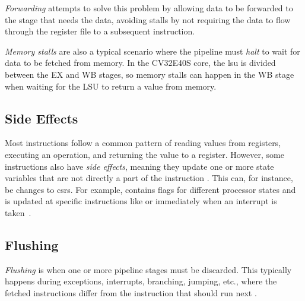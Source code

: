 \textit{Forwarding} attempts to solve this problem by allowing data to be forwarded to the stage that needs the data, avoiding stalls by not requiring the data to flow through the register file to a subsequent instruction.

\textit{Memory stalls} are also a typical scenario where the pipeline must \textit{halt} to wait for data to be fetched from memory. In the CV32E40S core, the \acrshort{lsu} is divided between the EX and WB stages, so memory stalls can happen in the WB stage when waiting for the LSU to return a value from memory.


\subsection{Side Effects}

Most instructions follow a common pattern of reading values from registers, executing an operation, and returning the value to a register.
However, some instructions also have \textit{side effects}, meaning they update one or more state variables that are not directly a part of the instruction \cite{taylorAdvancedRISCVVerification2023}. This can, for instance, be changes to \acrshort{csr}s. For example,  contains flags for different processor states and is updated at specific instructions like  or immediately when an interrupt is taken~\cite{openhwgroupExceptionsInterruptsCOREV2023}. 


%

\subsection{Flushing}
\label{sec:bg_flushing}

\textit{Flushing} is when one or more pipeline stages must be discarded. This typically happens during exceptions, interrupts, branching, jumping, etc., where the fetched instructions differ from the instruction that should run next \cite{pattersonComputerOrganizationDesign2021}.

